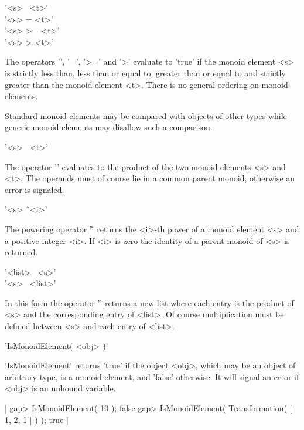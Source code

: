 \vspace{5mm}
'<s> \<\ <t>' \\
'<s> \<= <t>' \\
'<s> >= <t>' \\
'<s> > <t>'

The operators '\<', '\<=', '>=' and '>'  evaluate to 'true' if the monoid
element <s> is strictly less than, less than or equal to, greater than or
equal to and strictly  greater than the monoid  element <t>.  There is no
general ordering on monoid elements.

Standard monoid   elements may be  compared  with objects of  other types
while generic monoid elements may disallow such a comparison.


'<s> \*\ <t>'%

The operator '\*' evaluates to the product of the two monoid elements <s>
and <t>.   The  operands must of  course lie  in a  common parent monoid,
otherwise an error is signaled.

\vspace{5mm}
'<s> \^\ <i>'%

The powering  operator '\^' returns the  <i>-th power of a monoid element
<s> and a positive integer <i>.  If <i> is zero  the identity of a parent
monoid of <s> is returned.

\vspace{5mm}
'<list> \*\ <s>'%
\\
'<s> \*\ <list>'

In this form the operator '\*' returns a new list where each entry is the
product of <s>  and the   corresponding  entry  of <list>.    Of   course
multiplication must be defined between <s> and each entry of <list>.

%

'IsMonoidElement( <obj> )'

'IsMonoidElement' returns  'true' if the  object  <obj>, which may  be an
object of arbitrary type, is a monoid element, and 'false' otherwise.  It
will signal an error if <obj> is an unbound variable.

|    gap> IsMonoidElement( 10 );
    false
    gap> IsMonoidElement( Transformation( [ 1, 2, 1 ] ) );
    true |

